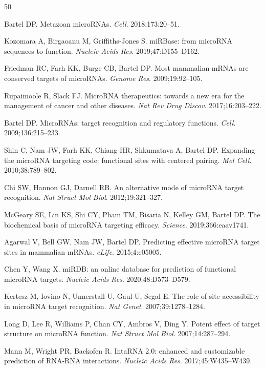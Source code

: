 \documentclass[sn-mathphys-num]{sn-jnl}
\begin{document}
\begin{thebibliography}{50}

Bartel DP. Metazoan microRNAs. \textit{Cell}. 2018;173:20--51.

Kozomara A, Birgaoanu M, Griffiths-Jones S. miRBase: from microRNA sequences to function. \textit{Nucleic Acids Res}. 2019;47:D155--D162.

Friedman RC, Farh KK, Burge CB, Bartel DP. Most mammalian mRNAs are conserved targets of microRNAs. \textit{Genome Res}. 2009;19:92--105.

Rupaimoole R, Slack FJ. MicroRNA therapeutics: towards a new era for the management of cancer and other diseases. \textit{Nat Rev Drug Discov}. 2017;16:203--222.

Bartel DP. MicroRNAs: target recognition and regulatory functions. \textit{Cell}. 2009;136:215--233.

Shin C, Nam JW, Farh KK, Chiang HR, Shkumatava A, Bartel DP. Expanding the microRNA targeting code: functional sites with centered pairing. \textit{Mol Cell}. 2010;38:789--802.

Chi SW, Hannon GJ, Darnell RB. An alternative mode of microRNA target recognition. \textit{Nat Struct Mol Biol}. 2012;19:321--327.

McGeary SE, Lin KS, Shi CY, Pham TM, Bisaria N, Kelley GM, Bartel DP. The biochemical basis of microRNA targeting efficacy. \textit{Science}. 2019;366:eaav1741.

Agarwal V, Bell GW, Nam JW, Bartel DP. Predicting effective microRNA target sites in mammalian mRNAs. \textit{eLife}. 2015;4:e05005.

Chen Y, Wang X. miRDB: an online database for prediction of functional microRNA targets. \textit{Nucleic Acids Res}. 2020;48:D573--D579.

Kertesz M, Iovino N, Unnerstall U, Gaul U, Segal E. The role of site accessibility in microRNA target recognition. \textit{Nat Genet}. 2007;39:1278--1284.

Long D, Lee R, Williams P, Chan CY, Ambros V, Ding Y. Potent effect of target structure on microRNA function. \textit{Nat Struct Mol Biol}. 2007;14:287--294.

Mann M, Wright PR, Backofen R. IntaRNA 2.0: enhanced and customizable prediction of RNA-RNA interactions. \textit{Nucleic Acids Res}. 2017;45:W435--W439.


\end{thebibliography}
\end{document}

